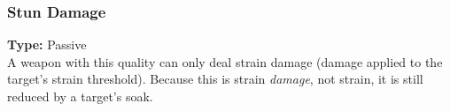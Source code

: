 \subsubsection{Stun Damage}
\label{iqty:stun}
\textbf{Type:} Passive\\
A weapon with this quality can only deal strain damage
(damage applied to the target’s strain threshold).
Because this is strain \textit{damage}, not strain,
it is still reduced by a target’s soak.
